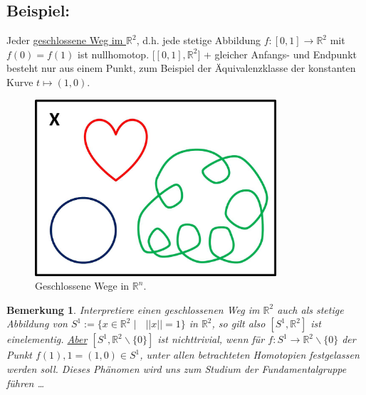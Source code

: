 \documentclass[a4paper,11pt,notitlepage]{report}
\newtheorem{remark}{Bemerkung}[chapter]
\newcommand{\R}{{\ensuremath{\mathbb{R}}}}
\newenvironment{bsp}[1]
{
\setlength{\fboxsep}{10pt}
\subsection*{Beispiel: #1}
\begin{upshape}
}
{
\end{upshape}
}
\begin{document}
\begin{bsp}{}
Jeder \underline{geschlossene Weg im $\R^2$}, d.h. jede stetige Abbildung $f \colon [0,1] \rightarrow \R^2$ mit $f(0) = f(1)$ ist nullhomotop.
$\bigl[[0,1], \R^2\bigr]$ + gleicher Anfangs- und Endpunkt besteht nur aus einem Punkt, zum Beispiel der Äquivalenzklasse der konstanten Kurve $t \mapsto (1,0)$.

\begin{figure}[h]
\centering
\includegraphics[width=0.8\textwidth]{images/Geschlossene_Wege.jpg}
\caption{Geschlossene Wege in $\R^n$.}
\end{figure}

\begin{remark}{}\label{nichttrivial}
Interpretiere einen geschlossenen Weg im $\R^2$ auch als stetige Abbildung von $S^1 := \{ x \in \R^2 \mid \text{ } ||x|| = 1\}$ in $\R^2$, so gilt also $[S^1, \R^2]$ ist einelementig.
\newline
\underline{Aber} $[S^1, \R^2 \backslash \{0\}]$ ist nichttrivial, wenn für $f \colon S^1 \rightarrow \R^2 \backslash \{0\}$ der Punkt $f(1), 1 = (1,0) \in S^1$, unter allen betrachteten Homotopien festgelassen werden soll. Dieses Phänomen wird uns zum Studium der Fundamentalgruppe führen \ldots
\end{remark}


\end{bsp}
\end{document}
